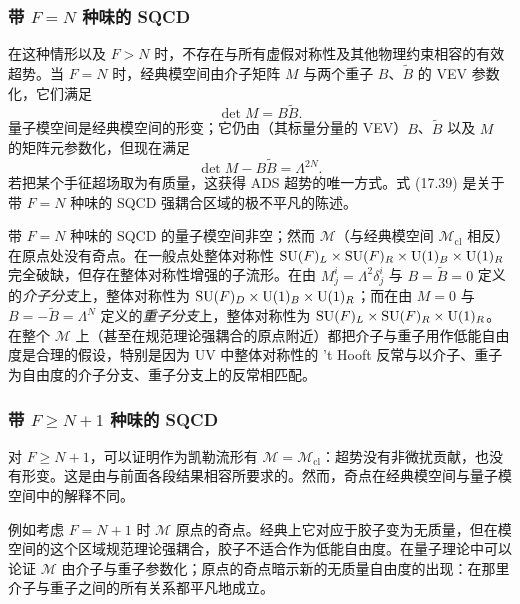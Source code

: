 \subsubsection*{带 $F=N$ 种味的 SQCD}

在这种情形以及 $F>N$ 时，不存在与所有虚假对称性及其他物理约束相容的有效超势。当 $F=N$ 时，经典模空间由介子矩阵 $M$ 与两个重子 $B$、$\tilde B$ 的 VEV 参数化，它们满足
\[
\det M=B\tilde B.
\]
量子模空间是经典模空间的形变；它仍由（其标量分量的 VEV）$B$、$\tilde B$ 以及 $M$ 的矩阵元参数化，但现在满足
\begin{equation}
\det M-B\tilde B=\Lambda^{2N}.
\tag{17.39}
\end{equation}
若把某个手征超场取为有质量，这获得 ADS 超势的唯一方式。式 (17.39) 是关于带 $F=N$ 种味的 SQCD 强耦合区域的极不平凡的陈述。


带 $F=N$ 种味的 SQCD 的量子模空间非空；然而 $\mathcal{M}$（与经典模空间 $\mathcal{M}_{\mathrm{cl}}$ 相反）在原点处没有奇点。在一般点处整体对称性 $\operatorname{SU}(F)_L\times\operatorname{SU}(F)_R\times\operatorname{U}(1)_B\times\operatorname{U}(1)_R$ 完全破缺，但存在整体对称性增强的子流形。在由 $M^i_j=\Lambda^2\delta^i_j$ 与 $B=\tilde B=0$ 定义的\emph{介子分支}上，整体对称性为 $\operatorname{SU}(F)_D\times\operatorname{U}(1)_B\times\operatorname{U}(1)_R$；而在由 $M=0$ 与 $B=-\tilde B=\Lambda^N$ 定义的\emph{重子分支}上，整体对称性为 $\operatorname{SU}(F)_L\times\operatorname{SU}(F)_R\times\operatorname{U}(1)_R$。在整个 $\mathcal{M}$ 上（甚至在规范理论强耦合的原点附近）都把介子与重子用作低能自由度是合理的假设，特别是因为 UV 中整体对称性的 't Hooft 反常与以介子、重子为自由度的介子分支、重子分支上的反常相匹配。

\subsubsection*{带 $F\ge N+1$ 种味的 SQCD}

对 $F\ge N+1$，可以证明作为凯勒流形有 $\mathcal{M}=\mathcal{M}_{\mathrm{cl}}$：超势没有非微扰贡献，也没有形变。这是由与前面各段结果相容所要求的。然而，奇点在经典模空间与量子模空间中的解释不同。

例如考虑 $F=N+1$ 时 $\mathcal{M}$ 原点的奇点。经典上它对应于胶子变为无质量，但在模空间的这个区域规范理论强耦合，胶子不适合作为低能自由度。在量子理论中可以论证 $\mathcal{M}$ 由介子与重子参数化；原点的奇点暗示新的无质量自由度的出现：在那里介子与重子之间的所有关系都平凡地成立。

